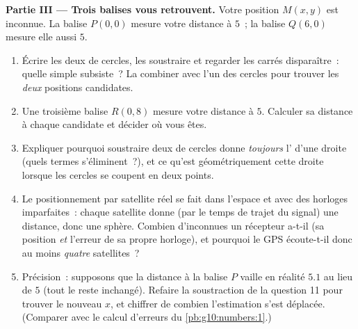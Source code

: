 \begin{problem}
\medskip
\noindent\textbf{Partie III --- Trois balises vous retrouvent.}
Votre position $M(x, y)$ est inconnue. La balise $P(0, 0)$ mesure
votre distance à $5$~; la balise $Q(6, 0)$ mesure elle aussi $5$.
\begin{enumerate}[resume]
  \item Écrire les deux  de cercles, les soustraire et
        regarder les carrés disparaître~: quelle  simple
        subsiste~? La combiner avec l'un des cercles pour trouver
        les \emph{deux} positions candidates.
  \item Une troisième balise $R(0, 8)$ mesure votre distance à $5$.
        Calculer sa distance à chaque candidate et décider où vous
        êtes.
  \item Expliquer pourquoi soustraire deux  de cercles
        donne \emph{toujours} l' d'une droite (quels termes
        s'éliminent~?), et ce qu'est géométriquement cette droite
        lorsque les cercles se coupent en deux points.
  \item Le positionnement par satellite réel se fait dans l'espace
        et avec des horloges imparfaites~: chaque satellite donne
        (par le temps de trajet du signal) une distance, donc une
        sphère. Combien d'inconnues un récepteur a-t-il (sa position
        \emph{et} l'erreur de sa propre horloge), et pourquoi le GPS
        écoute-t-il donc au moins \emph{quatre} satellites~?
  \item Précision~: supposons que la distance à la balise $P$ vaille
        en réalité $5.1$ au lieu de $5$ (tout le reste inchangé).
        Refaire la soustraction de la question 11 pour trouver le
        nouveau $x$, et chiffrer de combien l'estimation s'est
        déplacée. (Comparer avec le calcul d'erreurs du
        \cref{pb:g10:numbers:1}.)
\end{enumerate}


\end{problem}

